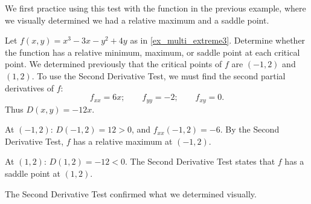We first practice using this test with the function in the previous example, where we visually determined we had a relative maximum and a saddle point.

\begin{example}\label{ex_multi_extreme4}%
Let $f(x,y) = x^3-3x-y^2+4y$ as in \autoref{ex_multi_extreme3}. Determine whether the function has a relative minimum, maximum, or saddle point at each critical point.
\solution
We determined previously that the critical points of $f$ are $(-1,2)$ and $(1,2)$. To use the Second Derivative Test, we must find the second partial derivatives of $f$:
\[f_{xx} = 6x;\qquad f_{yy} = -2;\qquad f_{xy} = 0.\]
Thus $D(x,y) = -12x$. 

At $(-1,2)$: $D(-1,2) = 12>0$, and $f_{xx}(-1,2) = -6$. By the Second Derivative Test, $f$ has a relative maximum at $(-1,2)$.

At $(1,2)$: $D(1,2) = -12 <0$. The Second Derivative Test states that $f$ has a saddle point at $(1,2)$.

The Second Derivative Test confirmed what we determined visually.
\end{example}


